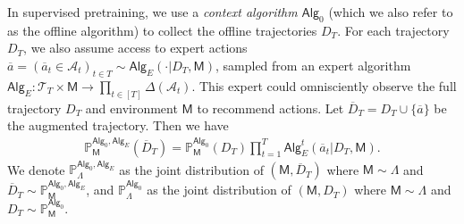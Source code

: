 \documentclass[10pt]{article}
\newcommand{\<}{\left\langle}
\renewcommand{\>}{\right\rangle}
\renewcommand{\P}{\mathbb{P}}
\newcommand{\inst}{{\mathsf{M}}}
\newcommand{\trajsp}{{\mathcal{T}}}
\newcommand{\widebar}[1]{\overline{#1}}
\newcommand{\eaction}{{\widebar{a}}}
\newcommand{\totlen}{{T}}
\newcommand{\sAlg}{{\mathsf{Alg}}}
\newcommand{\dset}{{D}}
\newcommand{\adset}{{\widebar{D}}}
\newcommand{\prior}{{\Lambda}}
\newcommand{\actionsp}{{\mathcal{A}}}
\newcommand{\shortexp}{{E}}
\begin{document}
In supervised pretraining, we use a \textit{context algorithm} $\sAlg_0$ (which we also refer to as the offline algorithm) to collect the offline trajectories $\dset_\totlen$. For each trajectory $\dset_\totlen$, we also assume access to expert actions $\eaction = ( \eaction_t \in \actionsp_t )_{t \in \totlen} \sim \sAlg_{\shortexp}(\cdot | \dset_\totlen, \inst)$, sampled from an expert algorithm $\sAlg_{\shortexp}: \trajsp_\totlen \times \inst \to \prod_{t \in [\totlen]} \Delta(\actionsp_t)$. This expert could omnisciently observe the full trajectory $\dset_\totlen$ and environment $\inst$ to recommend actions. Let $\adset_\totlen = \dset_\totlen \cup \{ \eaction \}$ be the augmented trajectory. Then we have
\begin{align*}
\textstyle \P^{\sAlg_0,\sAlg_{\shortexp}}_{\inst}(\adset_\totlen)=\P^{\sAlg_0}_{\inst}(\dset_\totlen)\prod_{t=1}^\totlen \sAlg_{\shortexp}^t (\eaction_t|\dset_{\totlen},\inst).
\end{align*}
We denote $\P^{\sAlg_0,\sAlg_\shortexp}_{\prior}$ as the joint distribution of $(\inst,\adset_\totlen)$ where $\inst \sim \prior$ and $\adset_\totlen \sim \P^{\sAlg_0,\sAlg_\shortexp}_{\inst}$, and $\P^{\sAlg_0}_{\prior}$ as the joint distribution of $(\inst,\dset_\totlen)$ where $\inst \sim \prior$ and $\dset_\totlen \sim \P^{\sAlg_0}_{\inst}$.
\end{document}
